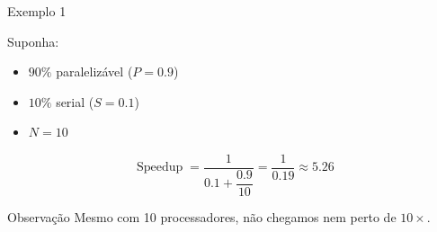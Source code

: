 \documentclass[aspectratio=169,11pt]{beamer}
\begin{document}
\begin{frame}{Exemplo 1}

    Suponha:

    \begin{itemize}
        \item $90\%$ paralelizável ($P=0.9$)
        \item $10\%$ serial ($S=0.1$)
        \item $N=10$
    \end{itemize}

    \vspace{0.30cm}

    \[
        \operatorname{Speedup}
        =
        \frac{1}{
            0.1 + \dfrac{0.9}{10}
        }
        =
        \frac{1}{0.19}
        \approx
        5.26
    \]

    \vspace{0.25cm}

    \begin{impactbox}{Observação}
        Mesmo com 10 processadores, não chegamos nem perto
        de $10\times$.
    \end{impactbox}

\end{frame}
\end{document}
